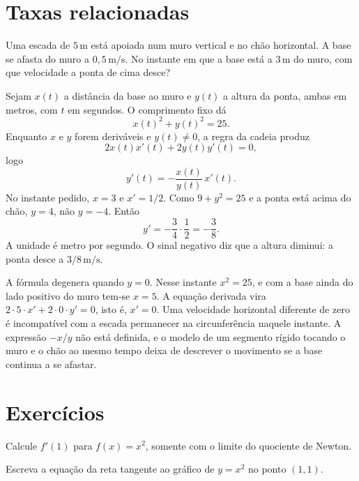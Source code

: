 \documentclass[11pt,a4paper]{article}
\begin{document}
\section{Taxas relacionadas}
\label{sec:taxas}

\begin{exemplo}
\label{ex:escada}
Uma escada de $5\,\mathrm{m}$ est\'a apoiada num muro vertical e no ch\~ao horizontal. A base se afasta do muro a $0{,}5\,\mathrm{m/s}$. No instante em que a base est\'a a $3\,\mathrm{m}$ do muro, com que velocidade a ponta de cima desce?

Sejam $x(t)$ a dist\^ancia da base ao muro e $y(t)$ a altura da ponta, ambas em metros, com $t$ em segundos. O comprimento fixo d\'a
\[
x(t)^2+y(t)^2=25.
\]
Enquanto $x$ e $y$ forem deriv\'aveis e $y(t)\neq 0$, a regra da cadeia produz
\[
2x(t)x'(t)+2y(t)y'(t)=0,
\]
logo
\[
y'(t)=-\frac{x(t)}{y(t)}\,x'(t).
\]
No instante pedido, $x=3$ e $x'=1/2$. Como $9+y^2=25$ e a ponta est\'a acima do ch\~ao, $y=4$, n\~ao $y=-4$. Ent\~ao
\[
y'=-\frac{3}{4}\cdot\frac{1}{2}=-\frac{3}{8}.
\]
A unidade \'e metro por segundo. O sinal negativo diz que a altura diminui: a ponta desce a $3/8\,\mathrm{m/s}$.

A f\'ormula degenera quando $y=0$. Nesse instante $x^2=25$, e com a base ainda do lado positivo do muro tem-se $x=5$. A equa\c{c}\~ao derivada vira $2\cdot 5\cdot x'+2\cdot 0\cdot y'=0$, isto \'e, $x'=0$. Uma velocidade horizontal diferente de zero \'e incompat\'ivel com a escada permanecer na circunfer\^encia naquele instante. A express\~ao $-x/y$ n\~ao est\'a definida, e o modelo de um segmento r\'igido tocando o muro e o ch\~ao ao mesmo tempo deixa de descrever o movimento se a base continua a se afastar.
\end{exemplo}

\section{Exerc\'icios}
\label{sec:ex-der}

\begin{exercicio}
Calcule $f'(1)$ para $f(x)=x^2$, somente com o limite do quociente de Newton.
\end{exercicio}

\begin{exercicio}
Escreva a equa\c{c}\~ao da reta tangente ao gr\'afico de $y=x^2$ no ponto $(1,1)$.
\end{exercicio}
\end{document}
